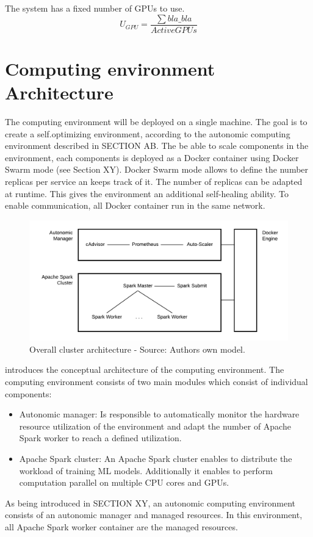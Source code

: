 The system has a fixed number of GPUs to use.
\begin{equation}
U_{GPU} = \dfrac{\sum bla\_bla}{ActiveGPUs}
\label{eq:formel}
\end{equation}


\section{Computing environment Architecture}
The computing environment will be deployed on a single machine.
The goal is to create a self.optimizing environment, according to the autonomic computing environment described in SECTION AB.
The be able to scale components in the environment, each components is deployed as a Docker container using Docker Swarm mode (see Section XY). Docker Swarm mode allows to define the number replicas per service an keeps track of it. The number of replicas can be adapted at runtime. This gives the environment an additional self-healing ability.
To enable communication, all Docker container run in the same network.

\begin{figure}[h]
\centering
\includegraphics[scale=0.8]{images/05_conceptual_design/cluster_architecture/overall_architecture}
\caption{Overall cluster architecture - Source: Authors own model.}
\label{fig:05_environment_concept}
\end{figure}
 introduces the conceptual architecture of the computing environment.
The computing environment consists of two main modules which consist of individual components:
\begin{itemize}
\item Autonomic manager: Is responsible to automatically monitor the hardware resource utilization of the environment and adapt the number of Apache Spark worker to reach a defined utilization.
\item Apache Spark cluster: An Apache Spark cluster enables to distribute the workload of training ML models. Additionally it enables to perform computation parallel on multiple CPU cores and GPUs.
\end{itemize}
As being introduced in SECTION XY, an autonomic computing environment consists of an autonomic manager and managed resources.
In this environment, all Apache Spark worker container are the managed resources.


